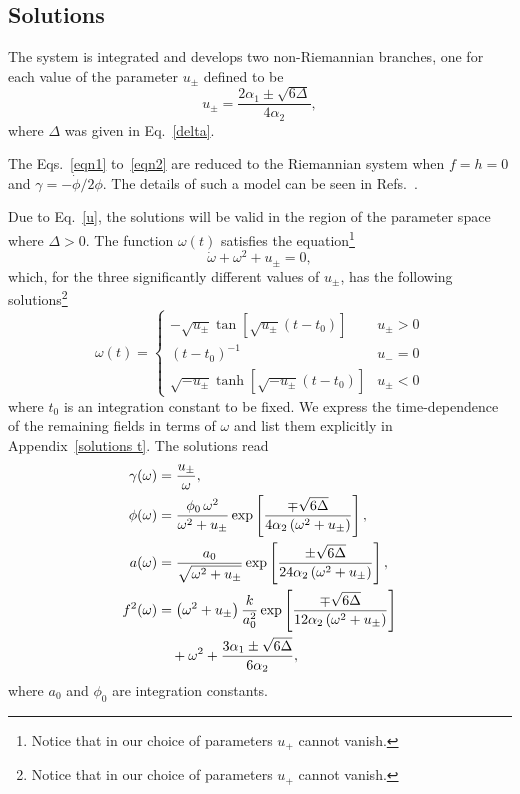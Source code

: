\documentclass[aps,prd,12pt,superscriptaddress,showpacs,showkeys,longbibliography,reprint,nofootinbib]{revtex4-1}
\begin{document}
\subsection{Solutions}

The system is integrated and develops two non-Riemannian branches, one for each value of the parameter $u_\pm$ defined to be
\begin{equation}
  \label{u}
  u_\pm=\frac{2\alpha_1\pm\sqrt{6\Delta}}{4\alpha_2},
\end{equation}
where $\Delta$ was given in Eq.~\eqref{delta}.

The Eqs.~\eqref{eqn1} to~\eqref{eqn2} are reduced to the Riemannian system when \mbox{$f=h=0$} and \mbox{$\gamma=-\dot{\phi}/2\phi$}. The details of such a model can be seen in Refs.~\cite{Deruelle:1986iv,Deruelle:2003ck,Henriques:1986jw,*Ishihara:1986if,Kleidis:1997mu}.

Due to Eq.~\eqref{u}, the solutions will be valid in the region of the parameter space where $\Delta>0$. The function $\omega(t)$ satisfies the equation\footnote{Notice that in our choice of parameters $u_+$ cannot vanish.}
\begin{equation}
  \dot{\omega}+\omega^2+u_{\pm} = 0,
\end{equation}
which, for the three significantly different values of $u_\pm$, has the following solutions\footnote{Notice that in our choice of parameters $u_+$ cannot vanish.}
\begin{equation}
  \omega(t) =
  \begin{cases}
    -\sqrt{u_\pm}\tan\left[\sqrt{u_\pm}\left(t-t_0\right)\right] & u_\pm > 0 \\
    \left(t-t_0\right)^{-1} & u_- = 0 \\
    \sqrt{-u_\pm}\tanh\left[\sqrt{-u_\pm}\left(t-t_0\right)\right] & u_\pm < 0
  \end{cases}
\end{equation}
where $t_0$ is an integration constant to be fixed. We express the time-dependence of the remaining fields in terms of $\omega$ and list them explicitly in Appendix~\ref{solutions t}. The solutions read
\begin{align}
  \gamma(\omega)&=\frac{u_\pm}{\omega},\\
  \phi(\omega)&=\frac{\phi_0\,\omega^2}{\omega^2+u_\pm}\exp\left[\frac{\mp\sqrt{6\Delta}}{4\alpha_2\left(\omega^2+u_\pm\right)}\right],\\
  a(\omega)&=\frac{a_0}{\sqrt{\omega^2+u_\pm}}\exp\left[\frac{\pm\sqrt{6\Delta}} {24\alpha_2\left(\omega^2+u_\pm\right)}\right],\\
  f^2(\omega)&=\left(\omega^2+u_\pm\right)\frac{k}{a_0^2}\exp\left[\frac{\mp\sqrt{6\Delta}}{12\alpha_2\left(\omega^2+u_\pm\right)}\right]\notag\\
  & \quad +\omega^2  + \frac{3\alpha_1\pm\sqrt{6\Delta}}{6\alpha_2},
\end{align}
where $a_0$ and $\phi_0$ are integration constants.
\end{document}
